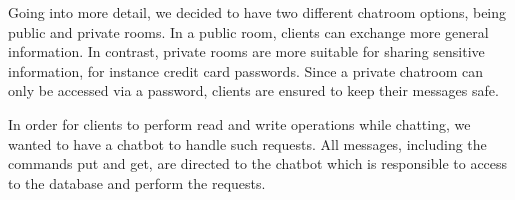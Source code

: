 Going into more detail, we decided to have two different chatroom options, being public and private rooms. In a public room, clients can exchange more general information. In contrast, private rooms are more suitable for sharing sensitive information, for instance credit card passwords. Since a private chatroom can only be accessed via a password, clients are ensured to keep their messages safe.

In order for clients to perform read and write operations while chatting, we wanted to have a chatbot to handle such requests. All messages, including the commands put and get, are directed to the chatbot which is responsible to access to the database and perform the requests.

